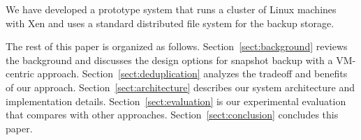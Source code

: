We have developed a prototype system that runs a cluster of Linux machines with Xen and uses 
a standard distributed file system for the backup storage. 

The rest of this paper is organized as follows.
Section~\ref{sect:background} reviews the background and discusses the  design options for snapshot backup 
with a VM-centric approach. 
Section~\ref{sect:deduplication}  analyzes the tradeoff and benefits of our approach. 
Section~\ref{sect:architecture}  describes our system architecture and implementation details.
Section~\ref{sect:evaluation} is our experimental evaluation that compares with other approaches.
Section~\ref{sect:conclusion}  concludes this paper.
